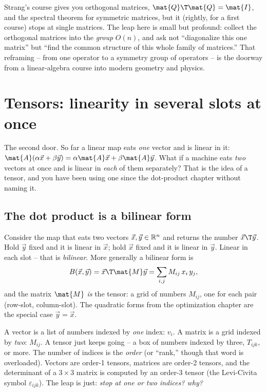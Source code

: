 \begin{strangbox}
Strang's course gives you orthogonal matrices, $\mat{Q}\T\mat{Q}=\mat{I}$, and the
spectral theorem for symmetric matrices, but it (rightly, for a first course) stops
at single matrices. The leap here is small but profound: collect the orthogonal
matrices into the \emph{group} $O(n)$, and ask not ``diagonalize this one matrix''
but ``find the common structure of this whole family of matrices.'' That reframing
-- from one operator to a symmetry group of operators -- is the doorway from a
linear-algebra course into modern geometry and physics.
\end{strangbox}

\section{Tensors: linearity in several slots at once}
\label{ch37:tensors}

The second door. So far a linear map eats \emph{one} vector and is linear in it:
$\mat{A}(\alpha\vec{x}+\beta\vec{y}) = \alpha\mat{A}\vec{x}+\beta\mat{A}\vec{y}$.
What if a machine eats \emph{two} vectors at once and is linear in \emph{each} of
them separately? That is the idea of a tensor, and you have been using one since
the dot-product chapter without naming it.

\subsection{The dot product is a bilinear form}
\label{ch37:bilinear}

Consider the map that eats two vectors $\vec{x},\vec{y}\in\mathbb{R}^n$ and returns the
number $\vec{x}\T\vec{y}$. Hold $\vec{y}$ fixed and it is linear in $\vec{x}$; hold
$\vec{x}$ fixed and it is linear in $\vec{y}$. Linear in each slot -- that is
\emph{bilinear}. More generally a bilinear form is
\[
  B(\vec{x},\vec{y}) = \vec{x}\T\mat{M}\vec{y}
  = \sum_{i,j} M_{ij}\, x_i\, y_j,
\]
and the matrix $\mat{M}$ \emph{is} the tensor: a grid of numbers $M_{ij}$, one for
each pair (row-slot, column-slot). The quadratic forms from the optimization
chapter are the special case $\vec{y}=\vec{x}$.

\begin{intuitionbox}
A vector is a list of numbers indexed by \emph{one} index: $v_i$. A matrix is a
grid indexed by \emph{two}: $M_{ij}$. A tensor just keeps going -- a box of numbers
indexed by three, $T_{ijk}$, or more. The number of indices is the \emph{order} (or
``rank,'' though that word is overloaded). Vectors are order-1 tensors, matrices
are order-2 tensors, and the determinant of a $3\times 3$ matrix is computed by an
order-3 tensor (the Levi-Civita symbol $\varepsilon_{ijk}$). The leap is just:
\emph{stop at one or two indices? why?}
\end{intuitionbox}

